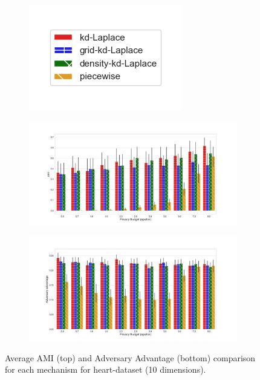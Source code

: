 \begin{figure}[H]
      \centering
      \begin{subfigure}{0.30\textwidth}
            \includegraphics[width=\textwidth]{Results/kd-laplace/ami_bar_comparison_legend.png}
      \end{subfigure}
      \begin{subfigure}{1\textwidth}
            \includegraphics[width=1\textwidth]{Results/kd-laplace/ami_heart-dataset_comparison.png}
      \end{subfigure}
      \begin{subfigure}{1\textwidth}
            \includegraphics[width=1\textwidth]{Results/kd-laplace/shokri_mi_adv_heart-dataset_comparison.png}
      \end{subfigure}
      \caption{Average AMI (top) and Adversary Advantage (bottom) comparison for each mechanism for heart-dataset (10 dimensions).}
      \label{fig:utility_heart-dataset_comparison_nd_plot}
\end{figure}
\newpage

